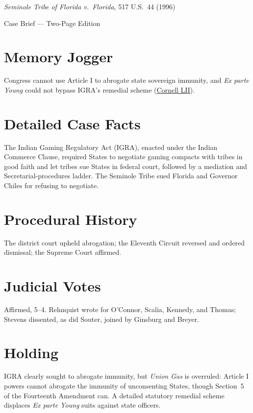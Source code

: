 \documentclass[12pt]{article}
\begin{document}
\begin{center}
{\LARGE \textit{Seminole Tribe of Florida v.\ Florida}, 517 U.S.\ 44 (1996)\par}
\vspace{0.5em}
{\large Case Brief --- Two-Page Edition\par}
\end{center}

\section{Memory Jogger}
Congress cannot use Article I to abrogate state sovereign immunity, and \textit{Ex parte Young} could not bypass IGRA's remedial scheme (\href{https://www.law.cornell.edu/supct/html/94-12.ZO.html}{Cornell LII}).

\section{Detailed Case Facts}
The Indian Gaming Regulatory Act (IGRA), enacted under the Indian Commerce Clause, required States to negotiate gaming compacts with tribes in good faith and let tribes sue States in federal court, followed by a mediation and Secretarial-procedures ladder. The Seminole Tribe sued Florida and Governor Chiles for refusing to negotiate.

\section{Procedural History}
The district court upheld abrogation; the Eleventh Circuit reversed and ordered dismissal; the Supreme Court affirmed.

\section{Judicial Votes}
Affirmed, 5--4. Rehnquist wrote for O'Connor, Scalia, Kennedy, and Thomas; Stevens dissented, as did Souter, joined by Ginsburg and Breyer.

\section{Holding}
IGRA clearly sought to abrogate immunity, but \textit{Union Gas} is overruled: Article I powers cannot abrogate the immunity of unconsenting States, though Section~5 of the Fourteenth Amendment can. A detailed statutory remedial scheme displaces \textit{Ex parte Young} suits against state officers.
\end{document}
